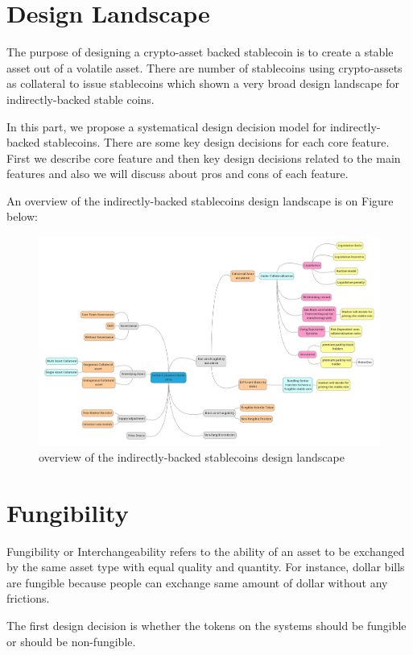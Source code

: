 \section{Design Landscape}
The purpose of designing a crypto-asset backed stablecoin is to create a stable asset out of a volatile asset. There are number of stablecoins using crypto-assets as collateral to issue stablecoins which shown a very broad design landscape for indirectly-backed stable coins.

In this part, we propose a systematical design decision model for indirectly-backed stablecoins. There are some key design decisions for each core feature. First we describe core feature and then key design decisions related to the main features and also we will discuss about pros and cons of each feature.

An overview of the indirectly-backed stablecoins design landscape is on Figure below:

\begin{figure} [ht]
\centering
\includegraphics[width=16cm]{Mindmap}
\caption{overview of the indirectly-backed stablecoins design landscape}
\end{figure}

\section{Fungibility}
Fungibility or Interchangeability refers to the ability of an asset to be exchanged by the same asset type with equal quality and quantity. For instance, dollar bills are fungible because people can exchange same amount of dollar without any frictions.

The first design decision is whether the tokens on the systems should be fungible or should be non-fungible. 

